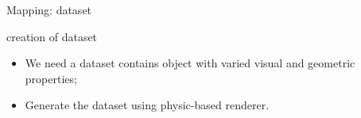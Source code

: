 \documentclass[10pt]{beamer}
\begin{document}
\begin{frame}{Mapping: dataset}

\begin{exampleblock}{creation of dataset}
\begin{itemize}
\item We need a dataset contains object with varied visual and geometric properties;
\item Generate the dataset using physic-based renderer.
\end{itemize}
\end{exampleblock}


\end{frame}
\end{document}
